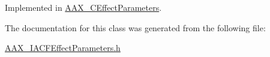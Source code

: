 Implemented in \mbox{\hyperlink{a01481_a6a2a5cfe04b343f6ac47becb0e77ba84}{A\+A\+X\+\_\+\+C\+Effect\+Parameters}}.



The documentation for this class was generated from the following file\+:\begin{DoxyCompactItemize}
\item 
\mbox{\hyperlink{a00530}{A\+A\+X\+\_\+\+I\+A\+C\+F\+Effect\+Parameters.\+h}}\end{DoxyCompactItemize}
